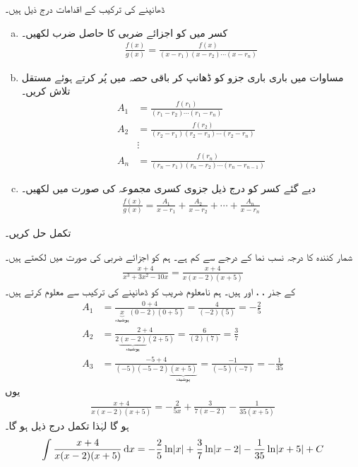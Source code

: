 ڈھانپنے کی ترکیب کے اقدامات  درج ذیل ہیں۔
\begin{enumerate}[a.]
\item
کسر میں  کو اجزائے ضربی کا حاصل ضرب لکھیں۔
\begin{align}\label{مساوات_طریقہ_ڈھانپنے_کی_ترکیب_ب}
\frac{f(x)}{g(x)}=\frac{f(x)}{(x-r_1)(x-r_2)\cdots(x-r_n)}
\end{align}
\item
مساوات میں باری باری جزو  کو ڈھانپ کر باقی حصہ میں  پُر کرتے ہوئے مستقل  تلاش کریں۔
\begin{align*}
A_1&=\frac{f(r_1)}{(r_1-r_2)\cdots (r_1-r_n)}\\
A_2&=\frac{f(r_2)}{(r_2-r_1)(r_2-r_3)\cdots (r_2-r_n)}\\
&\vdots\\
A_n&=\frac{f(r_n)}{(r_n-r_1)(r_n-r_2)\cdots(r_n-r_{n-1})}
\end{align*}
\item
 دیے گئے کسر  کو درج ذیل جزوی کسری مجموعہ کی صورت میں لکھیں۔
\begin{align*}
\frac{f(x)}{g(x)}=\frac{A_1}{x-r_1}+\frac{A_2}{x-r_2}+\cdots+\frac{A_n}{x-r_n}
\end{align*}
\end{enumerate} 

تکمل  حل کریں۔

شمار کنندہ  کا درجہ نسب نما  کے درجے  سے کم ہے۔ ہم  کو اجزائے ضربی کی صورت میں لکھتے ہیں۔
\begin{align*}
\frac{x+4}{x^3+3x^2-10x}=\frac{x+4}{x(x-2)(x+5)}
\end{align*}
 کے جذر ، ،  اور  ہیں۔ ہم نامعلوم   ضریب  کو ڈھانپنے کی ترکیب سے معلوم کرتے ہیں۔
\begin{align*}
A_1&=\frac{0+4}{\underbrace{\boxed{x}}_{\text{پوشیدہ}}(0-2)(0+5)}=\frac{4}{(-2)(5)}=-\frac{2}{5}\\
A_2&=\frac{2+4}{2\underbrace{\boxed{(x-2)}}_{\text{پوشیدہ}}(2+5)}=\frac{6}{(2)(7)}=\frac{3}{7}\\
A_3&=\frac{-5+4}{(-5)(-5-2)\underbrace{\boxed{(x+5)}}_{\text{پوشیدہ}}}=\frac{-1}{(-5)(-7)}=-\frac{1}{35}
\end{align*}
یوں 
\begin{align*}
\frac{x+4}{x(x-2)(x+5)}=-\frac{2}{5x}+\frac{3}{7(x-2)}-\frac{1}{35(x+5)}
\end{align*}
ہو گا  لہٰذا تکمل درج ذیل ہو گا۔
\begin{align*}
\int\frac{x+4}{x(x-2)(x+5)}\dif x=-\frac{2}{5}\ln\abs{x}+\frac{3}{7}\ln\abs{x-2}-\frac{1}{35}\ln\abs{x+5}+C
\end{align*}


